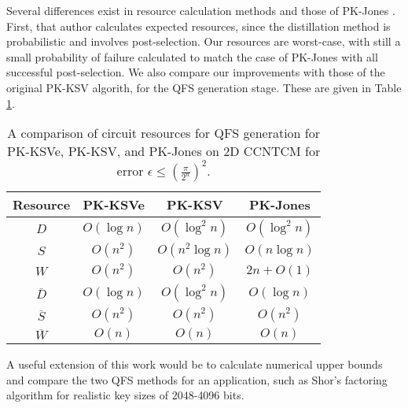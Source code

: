 Several differences exist in resource
calculation methods and those of PK-Jones \cite{Jones2012}. First, that
author calculates expected resources, since the distillation method is
probabilistic and involves post-selection. Our resources are worst-case,
with still a small probability of failure calculated to match the
case of PK-Jones with all successful post-selection. We also compare our
improvements with those of the original PK-KSV algorith, for the QFS generation stage.
These are given in Table \ref{tab:ksv-resources}.

\begin{table}[hbt!]
\begin{tabular}{|c|c|c|c|}
\hline
Resource       & PK-KSVe     & PK-KSV         & PK-Jones\\
\hline
$D$            & $O(\log n)$ & $O(\log^2 n)$  & $O(\log^2 n)$ \\
$S$            & $O(n^2)$    & $O(n^2\log n)$ & $O(n \log n)$ \\
$W$            & $O(n^2)$    & $O(n^2)$       & $2n + O(1)$ \\
$\overline{D}$ & $O(\log n)$ & $O(\log^2 n)$  & $O(\log n)$ \\
$\overline{S}$ & $O(n^2)$    & $O(n^2)$       & $O(n^2)$ \\
$\overline{W}$ & $O(n)$      & $O(n)$         & $O(n)$ \\
\hline
\end{tabular}
\caption{A comparison of circuit resources for QFS generation for PK-KSVe, PK-KSV, and PK-Jones on \textsf{2D CCNTCM} for error $\epsilon \le \left( \frac{\pi}{2^n} \right)^2$.}
\label{tab:ksv-resources}
\end{table}

A useful extension of this work would be to calculate numerical upper bounds and compare the
two QFS methods for an application, such as Shor's factoring algorithm for realistic key sizes of
2048-4096 bits.